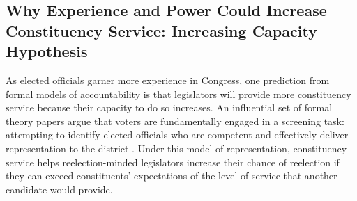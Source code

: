 \documentclass[12pt]{article}
\begin{document}

\subsection{Why Experience and Power Could Increase Constituency Service: Increasing Capacity Hypothesis}


As elected officials garner more experience in Congress, one prediction from formal models of accountability is that legislators will provide more constituency service because their capacity to do so increases. An influential set of formal theory papers argue that voters are fundamentally engaged in a screening task: attempting to identify elected officials who are competent and effectively deliver representation to the district \citep{AshworthBuenodeMesquita2006, gordon2009advantages}. Under this model of representation, constituency service helps reelection-minded legislators increase their chance of reelection if they can exceed constituents' expectations of the level of service that another candidate would provide.  
\end{document}
